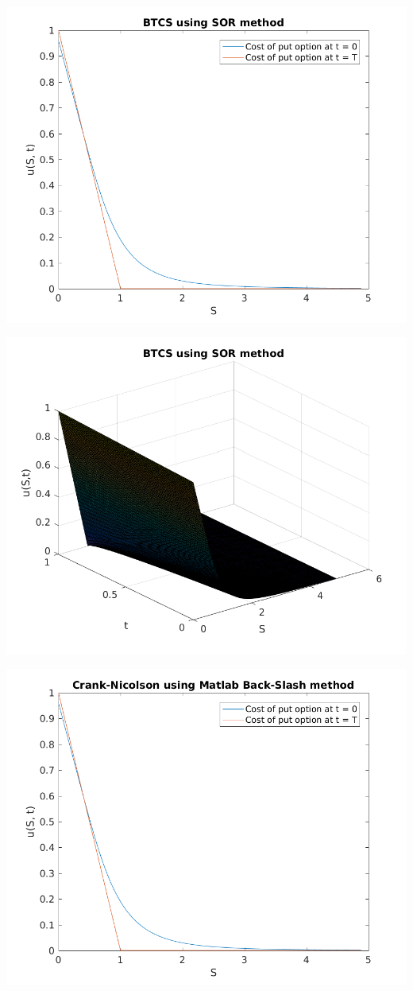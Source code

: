\documentclass{article}
\begin{document}
\includegraphics{"q2_9"}
\pagebreak


\includegraphics{"q2_10"}
\pagebreak


\includegraphics{"q2_11"}
\pagebreak
\end{document}
